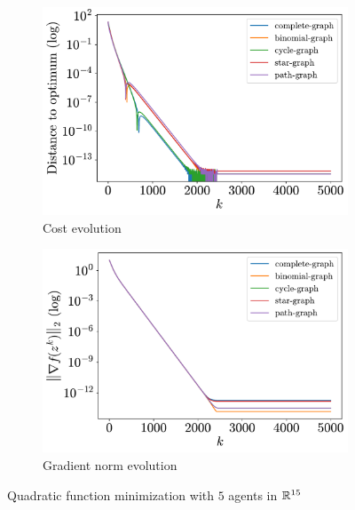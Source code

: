 \documentclass[a4paper,11pt,oneside]{book}
\begin{document}
\begin{figure}[tb!]
      \centering
      \begin{subfigure}[t]{0.46\linewidth}
            \centering
            \includegraphics[width=\linewidth]{./figs/quadratic/5_15/distance.pdf} 
            \caption{Cost evolution}
      \end{subfigure}
      \hfill
      \begin{subfigure}[t]{0.46\linewidth}
            \centering
            \includegraphics[width=\linewidth]{./figs/quadratic/5_15/gradient.pdf} 
            \caption{Gradient norm evolution}
      \end{subfigure}
      \caption{Quadratic function minimization with $5$ agents in ${\mathbb{R}}^{15}$}
      \label{fig:quadratic_5_15}
\end{figure}
\end{document}
